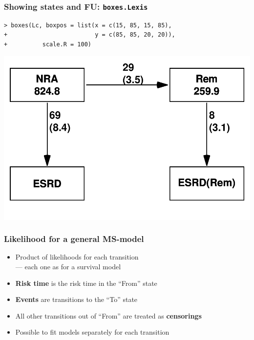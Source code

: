 \begin{frame}[fragile]
  \frametitle{Showing states and FU: \texttt{boxes.Lexis}}
\renewcommand{\baselinestretch}{0.8}
\footnotesize
\begin{verbatim}
> boxes(Lc, boxpos = list(x = c(15, 85, 15, 85),
+                         y = c(85, 85, 20, 20)), 
+          scale.R = 100)
\end{verbatim}
\normalsize
\renewcommand{\baselinestretch}{1.0}
\includegraphics[height=0.7\textheight,keepaspectratio]{./NRA-death-4}
\end{frame}

\begin{frame}[fragile]
  \frametitle{Likelihood for a general MS-model}
  \begin{itemize}[<+->]
  \item Product of likelihoods for each transition\\
        --- each one as for a survival model
  \item \textbf{Risk time} is the risk time in the ``From'' state
  \item \textbf{Events} are transitions to the ``To'' state
  \item All other transitions out of ``From'' are treated as \textbf{censorings}
  \item Possible to fit models separately for each transition
  \end{itemize}
\end{frame}

